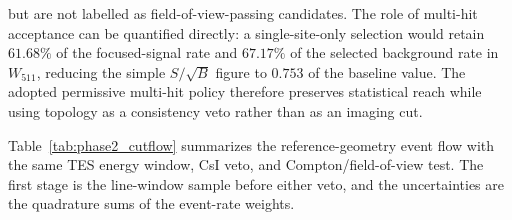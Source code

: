 \documentclass[11pt]{article}
\newcommand{\wii}{W_{511}}
\begin{document}
 but are not
labelled as field-of-view-passing candidates. The role of multi-hit acceptance
can be quantified directly: a single-site-only selection would retain
$61.68\%$ of the focused-signal rate and $67.17\%$ of the selected background
rate in $\wii$, reducing the simple $S/\sqrt{B}$ figure to $0.753$ of the
baseline value. The adopted permissive multi-hit policy therefore preserves
statistical reach while using topology as a consistency veto rather than as an
imaging cut.

Table~\ref{tab:phase2_cutflow} summarizes the reference-geometry event flow with
the same TES energy window, CsI veto, and Compton/field-of-view test. The first
stage is the line-window sample before either veto, and the uncertainties are the
quadrature sums of the event-rate weights.
\end{document}
